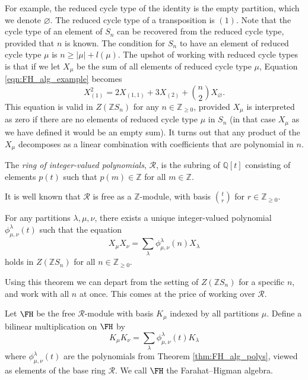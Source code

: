 For example, the reduced cycle type of the identity is the empty partition, which we denote $\varnothing$. The reduced cycle type of a transposition is $(1)$. Note that the cycle type of an element of $S_n$ can be recovered from the reduced cycle type, provided that $n$ is known. The condition for $S_n$ to have an element of reduced cycle type $\mu$ is $n \geq |\mu| + l(\mu)$. The upshot of working with reduced cycle types is that if we let $X_\mu$ be the sum of all elements of reduced cycle type $\mu$, Equation \eqref{eqn:FH_alg_example} becomes
\begin{equation} \label{precise_FH_alg_example}
X_{(1)}^2 = 2X_{(1,1)} + 3X_{(2)} + \binom{n}{2}X_{\varnothing}.
\end{equation}
This equation is valid in $Z(\mathbb{Z}S_n)$ for any $n \in \mathbb{Z}_{\geq 0}$, provided $X_\mu$ is interpreted as zero if there are no elements of reduced cycle type $\mu$ in $S_n$ (in that case $X_\mu$ as we have defined it would be an empty sum). It turns out that any product of the $X_\mu$ decomposes as a linear combination with coefficients that are polynomial in $n$.

\begin{definition}
The \emph{ring of integer-valued polynomials}, $\mathcal{R}$, is the subring of $\mathbb{Q}[t]$ consisting of elements $p(t)$ such that $p(m) \in \mathbb{Z}$ for all $m \in \mathbb{Z}$.
\end{definition}

It is well known that $\mathcal{R}$ is free as a $\mathbb{Z}$-module, with basis $\binom{t}{r}$ for $r \in \mathbb{Z}_{\geq 0}$.

\begin{theorem} \label{thm:FH_alg_polys}
For any partitions $\lambda, \mu, \nu$, there exists a unique integer-valued polynomial $\phi_{\mu, \nu}^\lambda(t)$ such that the equation
\[
X_\mu X_\nu = \sum_\lambda \phi_{\mu, \nu}^\lambda(n)X_\lambda
\]
holds in $Z(\mathbb{Z}S_n)$ for all $n \in \mathbb{Z}_{\geq 0}$.
\end{theorem}

Using this theorem we can depart from the setting of $Z(\mathbb{Z}S_n)$ for a specific $n$, and work with all $n$ at once. This comes at the price of working over $\mathcal{R}$.

\begin{definition} \label{def:FH_alg}
Let $\FH$ be the free $\mathcal{R}$-module with basis $K_\mu$ indexed by all partitions $\mu$. 
Define a bilinear multiplication on $\FH$ by
\[
K_\mu K_\nu = \sum_{\lambda} \phi_{\mu, \nu}^\lambda(t) K_\lambda
\]
where $\phi_{\mu, \nu}^\lambda(t)$ are the polynomials from Theorem \ref{thm:FH_alg_polys}, viewed as elements of the base ring $\mathcal{R}$. 
We call $\FH$ the Farahat--Higman algebra.
\end{definition}

